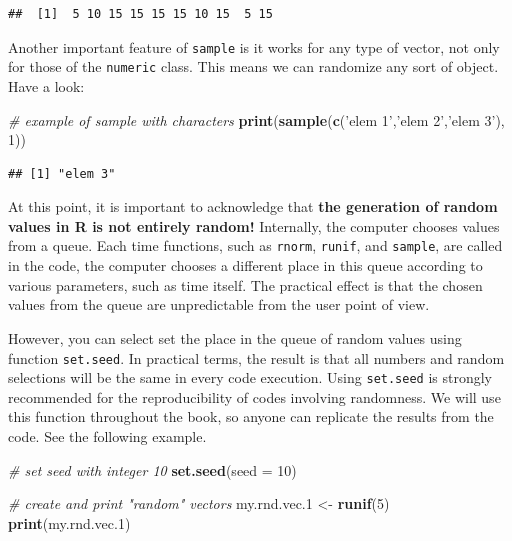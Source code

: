 \documentclass[11pt,]{book}
\newenvironment{Shaded}{\begin{snugshade}}{\end{snugshade}}
\newcommand{\KeywordTok}[1]{\textcolor[rgb]{0.27,0.27,0.27}{\textbf{#1}}}
\newcommand{\DataTypeTok}[1]{\textcolor[rgb]{0.27,0.27,0.27}{#1}}
\newcommand{\DecValTok}[1]{\textcolor[rgb]{0.06,0.06,0.06}{#1}}
\newcommand{\StringTok}[1]{\textcolor[rgb]{0.5,0.5,0.5}{#1}}
\newcommand{\CommentTok}[1]{\textcolor[rgb]{0.56,0.35,0.01}{\textit{#1}}}
\newcommand{\NormalTok}[1]{#1}
\begin{document}
\begin{verbatim}
##  [1]  5 10 15 15 15 15 10 15  5 15
\end{verbatim}

Another important feature of \texttt{sample} is it works for any type of
vector, not only for those of the \texttt{numeric} class. This means we
can randomize any sort of object. Have a look:

\begin{Shaded}
\begin{Highlighting}[]
\CommentTok{# example of sample with characters}
\KeywordTok{print}\NormalTok{(}\KeywordTok{sample}\NormalTok{(}\KeywordTok{c}\NormalTok{(}\StringTok{'elem 1'}\NormalTok{,}\StringTok{'elem 2'}\NormalTok{,}\StringTok{'elem 3'}\NormalTok{), }\DecValTok{1}\NormalTok{))}
\end{Highlighting}
\end{Shaded}

\begin{verbatim}
## [1] "elem 3"
\end{verbatim}

At this point, it is important to acknowledge that \textbf{the
generation of random values in R is not entirely random!} Internally,
the computer chooses values from a queue. Each time functions, such as
\texttt{rnorm}, \texttt{runif}, and \texttt{sample}, are called in the
code, the computer chooses a different place in this queue according to
various parameters, such as time itself. The practical effect is that
the chosen values from the queue are unpredictable from the user point
of view.

However, you can select set the place in the queue of random values
using function \texttt{set.seed}. In practical terms, the result is that
all numbers and random selections will be the same in every code
execution. Using \texttt{set.seed} is strongly recommended for the
reproducibility of codes involving randomness. We will use this function
throughout the book, so anyone can replicate the results from the code.
See the following example. 

\begin{Shaded}
\begin{Highlighting}[]
\CommentTok{# set seed with integer 10}
\KeywordTok{set.seed}\NormalTok{(}\DataTypeTok{seed =} \DecValTok{10}\NormalTok{)}

\CommentTok{# create and print "random" vectors}
\NormalTok{my.rnd.vec.}\DecValTok{1}\NormalTok{ <-}\StringTok{ }\KeywordTok{runif}\NormalTok{(}\DecValTok{5}\NormalTok{)}
\KeywordTok{print}\NormalTok{(my.rnd.vec.}\DecValTok{1}\NormalTok{)}
\end{Highlighting}
\end{Shaded}
\end{document}
